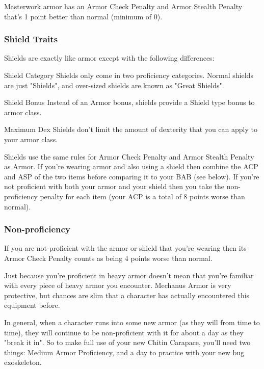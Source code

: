 Masterwork armor has an Armor Check Penalty and Armor Stealth Penalty that's 1 point better than normal (minimum of 0).

\subsubsection{Shield Traits}

Shields are exactly like armor except with the following differences:

\begin{description*}
\item[Shield Category] Shields only come in two proficiency categories. Normal shields are just "Shields", and over-sized shields are known as "Great Shields".

\item[Shield Bonus] Instead of an Armor bonus, shields provide a Shield type bonus to armor class.

\item[Maximum Dex] Shields don't limit the amount of dexterity that you can apply to your armor class.
\end{description*}

Shields use the same rules for Armor Check Penalty and Armor Stealth Penalty as Armor. If you're wearing armor and also using a shield then combine the ACP and ASP of the two items before comparing it to your BAB (see below). If you're not proficient with both your armor and your shield then you take the non-proficiency penalty for each item (your ACP is a total of 8 points worse than normal).

\subsubsection{Non-proficiency}

If you are not-proficient with the armor or shield that you're wearing then its Armor Check Penalty counts as being 4 points worse than normal.

Just because you're proficient in heavy armor doesn't mean that you're familiar with every piece of heavy armor you encounter. Mechanus Armor is very protective, but chances are slim that a character has actually encountered this equipment before.

In general, when a character runs into some new armor (as they will from time to time), they will continue to be non-proficient with it for about a day as they "break it in". So to make full use of your new Chitin Carapace, you'll need two things: Medium Armor Proficiency, and a day to practice with your new bug exoskeleton.

